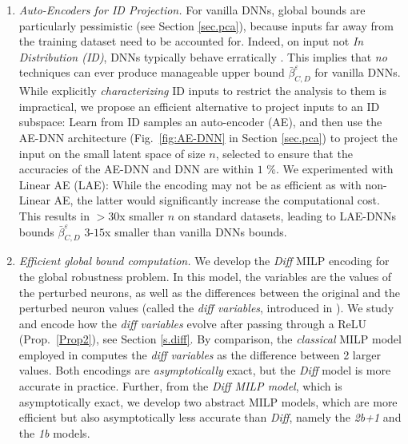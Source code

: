 \begin{enumerate}

	\item {\em Auto-Encoders for ID Projection.} For vanilla DNNs, global bounds are particularly pessimistic (see Section \ref{sec.pca}), because inputs far away from the training dataset
	need to be accounted for. Indeed, on input not {\em In Distribution (ID)}, DNNs typically behave erratically \cite{OOD}.
This implies that {\em no} techniques 
can ever produce manageable upper bound $\bar{\beta}^\varepsilon_{C,D}$
for vanilla DNNs. While explicitly {\em characterizing} ID inputs to restrict the analysis to them is impractical, we propose an efficient alternative to project inputs to an ID subspace: Learn from ID samples an auto-encoder (AE), and then use the AE-DNN architecture (Fig.~\ref{fig:AE-DNN} in Section \ref{sec.pca}) to project the input on the small latent space of size $n$, %
selected to ensure that the accuracies of the AE-DNN and DNN are within $1$ \%.
We experimented with Linear AE (LAE): While the encoding may not be as efficient as with non-Linear AE, the latter would significantly increase the computational cost. This results in $>30$x smaller $n$ on standard datasets, leading 
to LAE-DNNs bounds $\bar{\beta}^\varepsilon_{C,D}$ $3$-$15$x smaller than vanilla DNNs bounds.


\item {\em Efficient global bound computation.}
We develop the {\em Diff} MILP encoding for the global robustness problem.
In this model, the variables are the values of the perturbed neurons, as well as the differences between the original and the perturbed neuron values (called the {\em diff variables}, introduced in \cite{diff}). We study and encode how the {\em diff variables} evolve after passing through a ReLU (Prop.~\ref{Prop2}), see Section \ref{s.diff}. By comparison, the {\em classical} MILP model \cite{MILP} employed in \cite{vhagar,lipshitz,ITNE} 
computes the {\em diff variables} as the difference between 2 larger values.
Both encodings are {\em asymptotically} exact, but the {\em Diff} model is more accurate in practice.
Further, from the {\em Diff MILP model}, which is asymptotically exact, we develop two abstract MILP models, which are more efficient but also asymptotically less accurate than {\em Diff}, namely  the {\em 2b+1} and  the {\em 1b} models.
	



\end{enumerate}
